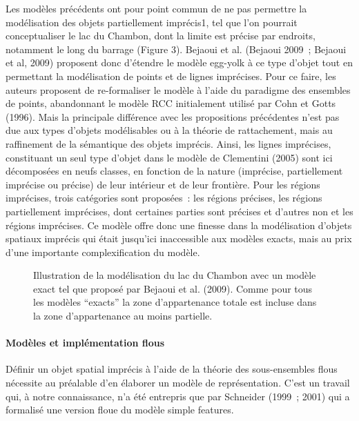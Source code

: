 Les modèles précédents ont pour point commun de ne pas permettre la
modélisation des objets partiellement imprécis1, tel que l’on pourrait
conceptualiser le lac du Chambon, dont la limite est précise par
endroits, notamment le long du barrage (Figure 3). Bejaoui et
al. (Bejaoui 2009 ; Bejaoui et al, 2009) proposent donc d’étendre le
modèle egg-yolk à ce type d’objet tout en permettant la modélisation
de points et de lignes imprécises. Pour ce faire, les auteurs
proposent de re-formaliser le modèle à l’aide du paradigme des
ensembles de points, abandonnant le modèle RCC initialement utilisé
par Cohn et Gotts (1996). Mais la principale différence avec les
propositions précédentes n’est pas due aux types d’objets modélisables
ou à la théorie de rattachement, mais au raffinement de la sémantique
des objets imprécis. Ainsi, les lignes imprécises, constituant un seul
type d’objet dans le modèle de Clementini (2005) sont ici décomposées
en neufs classes, en fonction de la nature (imprécise, partiellement
imprécise ou précise) de leur intérieur et de leur frontière. Pour les
régions imprécises, trois catégories sont proposées : les régions
précises, les régions partiellement imprécises, dont certaines parties
sont précises et d’autres non et les régions imprécises. Ce modèle
offre donc une finesse dans la modélisation d’objets spatiaux imprécis
qui était jusqu’ici inaccessible aux modèles exacts, mais au prix
d’une importante complexification du modèle.

\begin{figure}
  \centering
  \caption{Illustration de la modélisation du lac du Chambon avec un
    modèle exact tel que proposé par Bejaoui et al. (2009). Comme pour
    tous les modèles “exacts” la zone d’appartenance totale est
    incluse dans la zone d’appartenance au moins partielle.}
  \label{fig:champ_exact}
\end{figure}

\paragraph{Modèles et implémentation flous}

Définir un objet spatial imprécis à l’aide de la théorie des
sous-ensembles flous nécessite au préalable d’en élaborer un modèle de
représentation. C’est un travail qui, à notre connaissance, n’a été
entrepris que par Schneider (1999 ; 2001) qui a formalisé une version
floue du modèle simple features.

